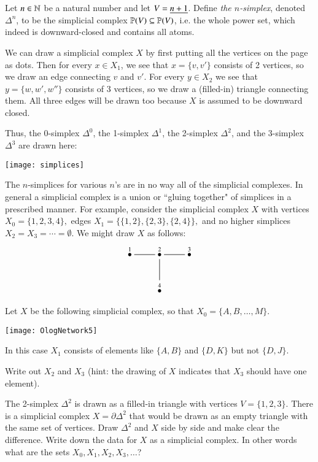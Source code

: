 \begin{example}

Let $n\in{\mathbb N}$ be a natural number and let $V=\underline{n+1}$. Define {\em the $n$-simplex}, denoted $\Delta^n$, to be the simplicial complex ${\mathbb P}(V)\subseteq{\mathbb P}(V)$, i.e. the whole power set, which indeed is downward-closed and contains all atoms. 

\end{example}


We can draw a simplicial complex $X$ by first putting all the vertices on the page as dots. Then for every $x\in X_1$, we see that $x=\{v,v'\}$ consists of 2 vertices, so we draw an edge connecting $v$ and $v'$. For every $y\in X_2$ we see that $y=\{w,w',w''\}$ consists of 3 vertices, so we draw a (filled-in) triangle connecting them. All three edges will be drawn too because $X$ is assumed to be downward closed.

Thus, the 0-simplex $\Delta^0$, the 1-simplex $\Delta^1$, the 2-simplex $\Delta^2$, and the 3-simplex $\Delta^3$ are drawn here:
\begin{center}
\texttt{[image: simplices]}
\end{center} 

The $n$-simplices for various $n$'s are in no way all of the simplicial complexes. In general a simplicial complex is a union or ``gluing together" of simplices in a prescribed manner. For example, consider the simplicial complex $X$ with vertices $X_0=\{1,2,3,4\},$ edges $X_1=\{\{1,2\},\{2,3\},\{2,4\}\},$ and no higher simplices $X_2=X_3=\cdots=\emptyset$. We might draw $X$ as follows:
$$\xymatrix{\LMO{1}\ar@{-}[r]&\LMO{2}\ar@{-}[r]\ar@{-}[d]&\LMO{3}\\&\LMO{4}}$$

\begin{exercise}
Let $X$ be the following simplicial complex, so that $X_0=\{A,B,\ldots,M\}$. 
\begin{center}
\texttt{[image: OlogNetwork5]}
\end{center} 
In this case $X_1$ consists of elements like $\{A,B\}$ and $\{D,K\}$ but not $\{D,J\}$. 

Write out $X_2$ and $X_3$ (hint: the drawing of $X$ indicates that $X_3$ should have one element).
\end{exercise}

\begin{exercise}
The 2-simplex $\Delta^2$ is drawn as a filled-in triangle with vertices $V=\{1,2,3\}$. There is a simplicial complex $X=\partial\Delta^2$ that would be drawn as an empty triangle with the same set of vertices. 
\sexc Draw $\Delta^2$ and $X$ side by side and make clear the difference.
\next Write down the data for $X$ as a simplicial complex. In other words what are the sets $X_0, X_1, X_2, X_3,\ldots$?
\endsexc
\end{exercise}

